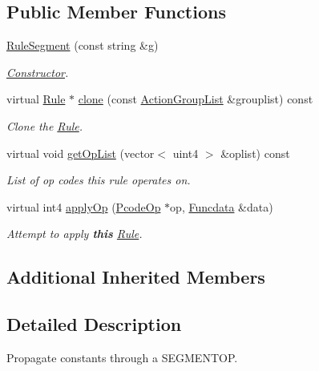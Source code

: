 \subsection*{Public Member Functions}
\begin{DoxyCompactItemize}
\item 
\mbox{\hyperlink{class_rule_segment_a7f34a2aa947738210be8837d3e42a268}{Rule\+Segment}} (const string \&g)
\begin{DoxyCompactList}\small\item\em \mbox{\hyperlink{class_constructor}{Constructor}}. \end{DoxyCompactList}\item 
virtual \mbox{\hyperlink{class_rule}{Rule}} $\ast$ \mbox{\hyperlink{class_rule_segment_a12ddd2117c6a7ac26f4ae3b053abd363}{clone}} (const \mbox{\hyperlink{class_action_group_list}{Action\+Group\+List}} \&grouplist) const
\begin{DoxyCompactList}\small\item\em Clone the \mbox{\hyperlink{class_rule}{Rule}}. \end{DoxyCompactList}\item 
virtual void \mbox{\hyperlink{class_rule_segment_afc2e633c99b52bdfadad04b2749e3e26}{get\+Op\+List}} (vector$<$ uint4 $>$ \&oplist) const
\begin{DoxyCompactList}\small\item\em List of op codes this rule operates on. \end{DoxyCompactList}\item 
virtual int4 \mbox{\hyperlink{class_rule_segment_ae9c0b0fb9076088f2adf5342f8e100f6}{apply\+Op}} (\mbox{\hyperlink{class_pcode_op}{Pcode\+Op}} $\ast$op, \mbox{\hyperlink{class_funcdata}{Funcdata}} \&data)
\begin{DoxyCompactList}\small\item\em Attempt to apply {\bfseries{this}} \mbox{\hyperlink{class_rule}{Rule}}. \end{DoxyCompactList}\end{DoxyCompactItemize}
\subsection*{Additional Inherited Members}


\subsection{Detailed Description}
Propagate constants through a S\+E\+G\+M\+E\+N\+T\+OP. 

